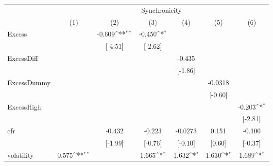 {
\def\sym#1{\ifmmode^{#1}\else\(^{#1}\)\fi}
\begin{tabular}{l*{6}{c}}
\hline\hline
            &\multicolumn{6}{c}{Synchronicity}                                                                                                  \\\cmidrule(lr){2-7}
            &\multicolumn{1}{c}{(1)}         &\multicolumn{1}{c}{(2)}         &\multicolumn{1}{c}{(3)}         &\multicolumn{1}{c}{(4)}         &\multicolumn{1}{c}{(5)}         &\multicolumn{1}{c}{(6)}         \\
\hline
Excess      &                     &      -0.609\sym{**} &      -0.450\sym{*}  &                     &                     &                     \\
            &                     &     [-4.51]         &     [-2.62]         &                     &                     &                     \\
[1em]
ExcessDiff  &                     &                     &                     &      -0.435         &                     &                     \\
            &                     &                     &                     &     [-1.86]         &                     &                     \\
[1em]
ExcessDummy &                     &                     &                     &                     &     -0.0318         &                     \\
            &                     &                     &                     &                     &     [-0.60]         &                     \\
[1em]
ExcessHigh  &                     &                     &                     &                     &                     &      -0.203\sym{*}  \\
            &                     &                     &                     &                     &                     &     [-2.81]         \\
[1em]
cfr         &                     &      -0.432         &      -0.223         &     -0.0273         &       0.151         &      -0.100         \\
            &                     &     [-1.99]         &     [-0.76]         &     [-0.10]         &      [0.60]         &     [-0.37]         \\
[1em]
volatility  &       0.575\sym{**} &                     &       1.665\sym{*}  &       1.632\sym{*}  &       1.630\sym{*}  &       1.689\sym{*}  \\

\end{tabular}}
